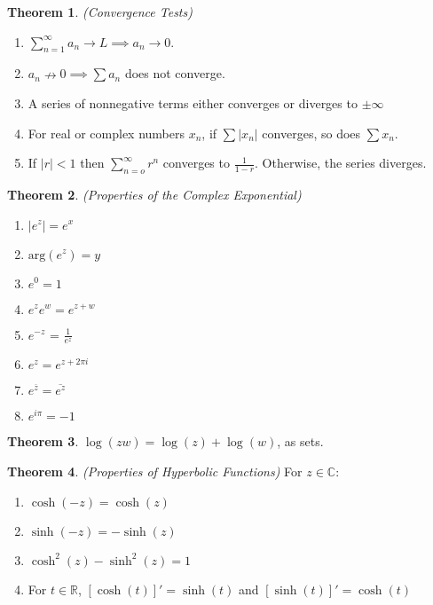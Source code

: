 \documentclass[a4paper]{article}
\theoremstyle{definition}
\newtheorem{theorem}{Theorem}
\begin{document}
	\begin{theorem}
		\emph{(Convergence Tests)}
		\begin{enumerate}[label=\alph*.]
			\item $\sum_{n=1}^{\infty} a_{n} \rightarrow L \implies a_{n} \rightarrow 0$.
			\item $a_{n} \nrightarrow 0 \implies \sum a_{n}$ does not converge.
			\item A series of nonnegative terms either converges or diverges to $\pm \infty$
			\item For real or complex numbers $x_{n}$, if $\sum |x_{n}|$ converges, so does $\sum x_{n}$.
			\item If $|r| < 1$ then $\sum_{n=o}^{\infty} r^{n}$ converges to $\frac{1}{1 - r}$. Otherwise, the series diverges.
		\end{enumerate}
	\end{theorem}
	
	\begin{theorem}
		\emph{(Properties of the Complex Exponential)}
		\begin{enumerate}[label=\alph*.]
			\item $|e^{z}| = e^{x}$
			\item $\text{arg}(e^{z}) = y$
			\item $e^{0} = 1$
			\item $e^{z}e^{w} = e^{z+w}$
			\item $e^{-z}$ = $\frac{1}{e^{z}}$
			\item $e^{z} = e^{z + 2 \pi i}$
			\item $e^{\overline{z}} = \overline{e^{z}}$
			\item $e^{i \pi} = -1$
		\end{enumerate}
	\end{theorem}
	
	\begin{theorem}
		$\log(zw) = \log(z) + \log(w)$, as sets.
	\end{theorem}
	
	\begin{theorem}
		\emph{(Properties of Hyperbolic Functions)}
		For $z \in \mathbb{C}$:
		\begin{enumerate}[label=\alph*.]
			\item $\cosh{(-z)} = \cosh{(z)}$
			\item $\sinh{(-z)} = -\sinh{(z)}$
			\item $\cosh^{2}{(z)} - \sinh^{2}{(z)} = 1$
			\item For $t \in \mathbb{R}$, $[\cosh{(t)}]' = \sinh{(t)}$ and $[\sinh{(t)}]' = \cosh{(t)}$
		\end{enumerate}
	\end{theorem}
	
\end{document}
